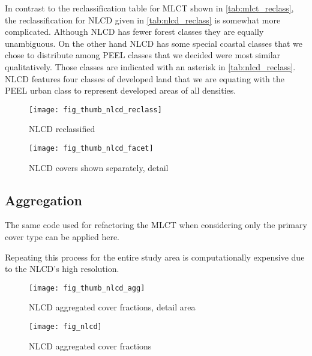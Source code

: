 In contrast to the reclassification table for MLCT shown in
\autoref{tab:mlct_reclass}, the reclassification for NLCD given in
\autoref{tab:nlcd_reclass} is somewhat more complicated.  Although
NLCD has fewer forest classes they are equally unambiguous.  On the
other hand NLCD has some special coastal classes that we chose to
distribute among PEEL classes that we decided were most similar
qualitatively.  Those classes are indicated with an asterisk in
\autoref{tab:nlcd_reclass}.  NLCD features four classes of developed
land that we are equating with the PEEL urban class to represent
developed areas of all densities.



\begin{figure}[ht] 
\centering


\texttt{[image: fig\_thumb\_nlcd\_reclass]}
 
\caption{NLCD reclassified} 
\label{fig:thumb_nlcd_reclass} 
\end{figure} 

\begin{figure}[ht] 
\centering
  

\texttt{[image: fig\_thumb\_nlcd\_facet]}
 
\caption{NLCD covers shown separately, detail} 
\label{fig:thumb_nlcd_facet} 
\end{figure} 

\clearpage

\subsection{Aggregation}
\label{sec:nlcd-aggr}

The same code used for refactoring the MLCT when considering only the
primary cover type can be applied here.

Repeating this process for the entire study area is computationally
expensive due to the NLCD's high resolution.


 

\begin{figure}[ht] 
\centering
  


\texttt{[image: fig\_thumb\_nlcd\_agg]}
 
\caption{NLCD aggregated cover fractions, detail area}
\label{fig:thumb_nlcd_agg}
\end{figure} 



\begin{figure}[ht] 
  \centering
  
  \texttt{[image: fig\_nlcd]}
\caption{NLCD aggregated cover fractions}
\label{fig:nlcd}
\end{figure} 


